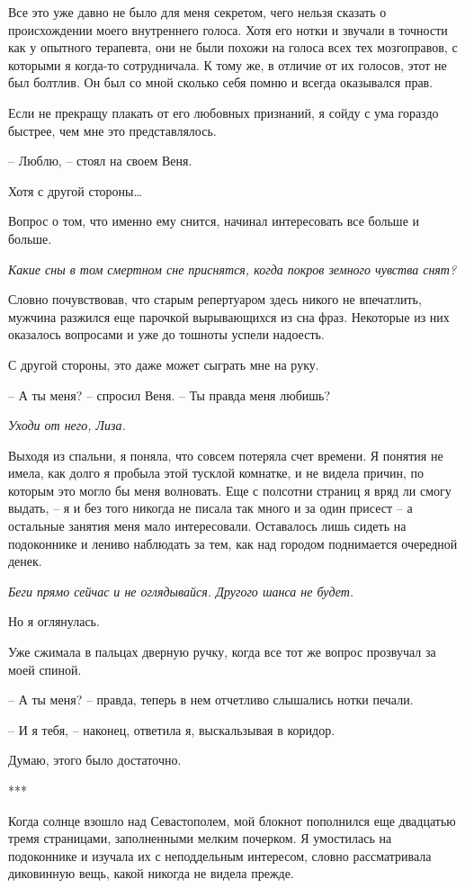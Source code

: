 \documentclass[
]{book}
\begin{document}
Все это уже давно не было для меня секретом, чего нельзя сказать о происхождении моего внутреннего голоса. Хотя его нотки и звучали в точности как у опытного терапевта, они не были похожи на голоса всех тех мозгоправов, с которыми я когда-то сотрудничала. К тому же, в отличие от их голосов, этот не был болтлив. Он был со мной сколько себя помню и всегда оказывался прав.

Если не прекращу плакать от его любовных признаний, я сойду с ума гораздо быстрее, чем мне это представлялось.

-- Люблю, -- стоял на своем Веня.

Хотя с другой стороны\ldots{}

Вопрос о том, что именно ему снится, начинал интересовать все больше и больше.

\emph{Какие сны в том смертном сне приснятся, когда покров земного чувства снят?}

Словно почувствовав, что старым репертуаром здесь никого не впечатлить, мужчина разжился еще парочкой вырывающихся из сна фраз. Некоторые из них оказалось вопросами и уже до тошноты успели надоесть.

С другой стороны, это даже может сыграть мне на руку.

-- А ты меня? -- спросил Веня. -- Ты правда меня любишь?

\emph{Уходи от него, Лиза.}

Выходя из спальни, я поняла, что совсем потеряла счет времени. Я понятия не имела, как долго я пробыла этой тусклой комнатке, и не видела причин, по которым это могло бы меня волновать. Еще с полсотни страниц я вряд ли смогу выдать, -- я и без того никогда не писала так много и за один присест -- а остальные занятия меня мало интересовали. Оставалось лишь сидеть на подоконнике и лениво наблюдать за тем, как над городом поднимается очередной денек.

\emph{Беги прямо сейчас и не оглядывайся. Другого шанса не будет.}

Но я оглянулась.

Уже сжимала в пальцах дверную ручку, когда все тот же вопрос прозвучал за моей спиной.

-- А ты меня? -- правда, теперь в нем отчетливо слышались нотки печали.

-- И я тебя, -- наконец, ответила я, выскальзывая в коридор.

Думаю, этого было достаточно.

***

Когда солнце взошло над Севастополем, мой блокнот пополнился еще двадцатью тремя страницами, заполненными мелким почерком. Я умостилась на подоконнике и изучала их с неподдельным интересом, словно рассматривала диковинную вещь, какой никогда не видела прежде.
\end{document}
